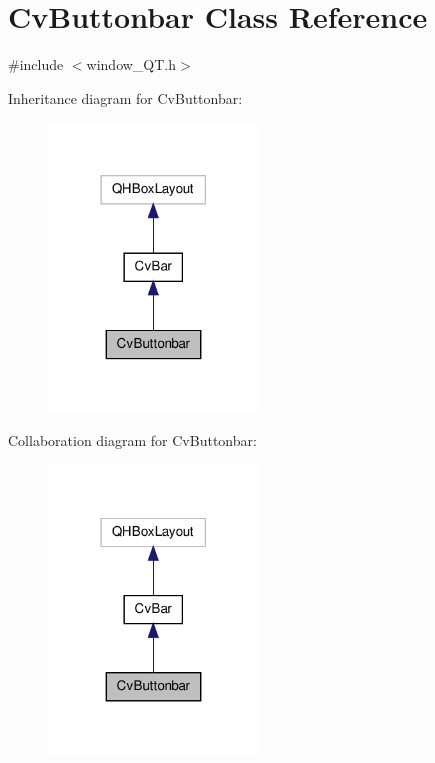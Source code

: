 \hypertarget{classCvButtonbar}{\section{Cv\-Buttonbar Class Reference}
\label{classCvButtonbar}
}


{\ttfamily \#include $<$window\-\_\-\-Q\-T.\-h$>$}



Inheritance diagram for Cv\-Buttonbar\-:
\nopagebreak
\begin{figure}[H]
\begin{center}
\leavevmode
\includegraphics[width=158pt]{classCvButtonbar__inherit__graph}
\end{center}
\end{figure}


Collaboration diagram for Cv\-Buttonbar\-:
\nopagebreak
\begin{figure}[H]
\begin{center}
\leavevmode
\includegraphics[width=158pt]{classCvButtonbar__coll__graph}
\end{center}
\end{figure}
